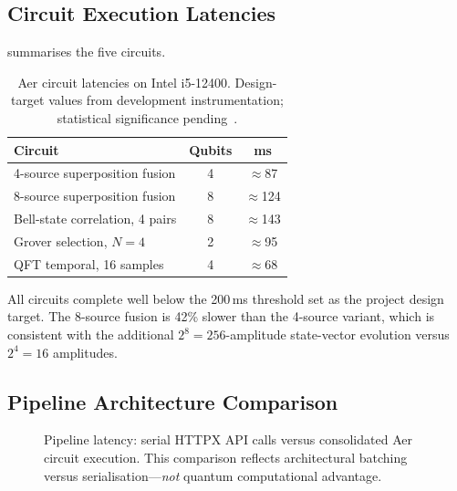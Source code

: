 \documentclass[conference]{IEEEtran}
\begin{document}
\subsection{Circuit Execution Latencies}

 summarises the five circuits.

\begin{table}[t]
\centering
\caption{Aer circuit latencies on Intel i5-12400. Design-target values
from development instrumentation; statistical significance
pending~\cite{bharti2022noisy}.}\label{tab:latency}
\begin{tabular}{@{}lcc@{}}
\toprule
\textbf{Circuit}                      & \textbf{Qubits} & \textbf{ms} \\
\midrule
4-source superposition fusion         & 4               & $\approx$87  \\
8-source superposition fusion         & 8               & $\approx$124 \\
Bell-state correlation, 4 pairs       & 8               & $\approx$143 \\
Grover selection, $N{=}4$             & 2               & $\approx$95  \\
QFT temporal, 16 samples              & 4               & $\approx$68  \\
\bottomrule
\end{tabular}
\end{table}

All circuits complete well below the 200\,ms threshold set as the
project design target.
The 8-source fusion is 42\% slower than the 4-source variant, which is
consistent with the additional $2^8 = 256$-amplitude state-vector
evolution versus $2^4 = 16$ amplitudes.

\subsection{Pipeline Architecture Comparison}

\begin{figure}[t]
\centering
{}
\caption{Pipeline latency: serial HTTPX API calls versus consolidated
Aer circuit execution. This comparison reflects architectural batching
versus serialisation---\emph{not} quantum computational
advantage.}\label{fig:compare}
\end{figure}
\end{document}
